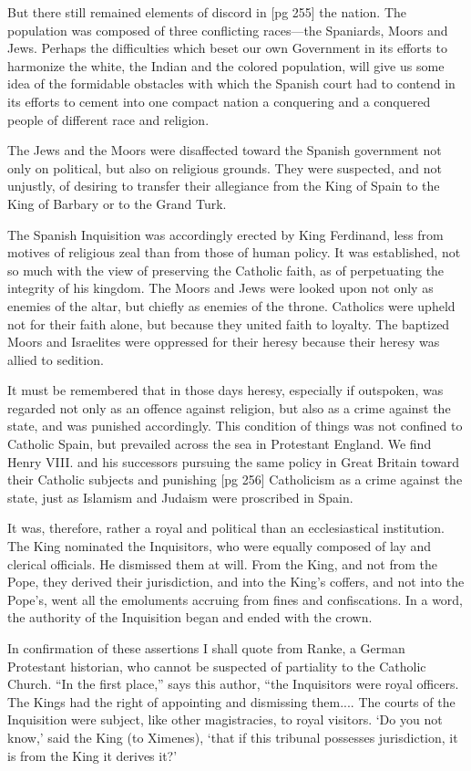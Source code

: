 But there still remained elements of discord in
[pg 255]
the nation. The population was composed of three
conflicting races—the Spaniards, Moors and Jews.
Perhaps the difficulties which beset our own Government
in its efforts to harmonize the white, the
Indian and the colored population, will give us
some idea of the formidable obstacles with which
the Spanish court had to contend in its efforts to
cement into one compact nation a conquering and
a conquered people of different race and religion.

The Jews and the Moors were disaffected toward
the Spanish government not only on political,
but also on religious grounds. They were suspected,
and not unjustly, of desiring to transfer
their allegiance from the King of Spain to the
King of Barbary or to the Grand Turk.

The Spanish Inquisition was accordingly
erected by King Ferdinand, less from motives
of religious zeal than from those of human
policy. It was established, not so much with the
view of preserving the Catholic faith, as of perpetuating
the integrity of his kingdom. The
Moors and Jews were looked upon not only as
enemies of the altar, but chiefly as enemies of
the throne. Catholics were upheld not for their
faith alone, but because they united faith to loyalty.
The baptized Moors and Israelites were oppressed
for their heresy because their heresy was
allied to sedition.

It must be remembered that in those days heresy,
especially if outspoken, was regarded not only
as an offence against religion, but also as a crime
against the state, and was punished accordingly.
This condition of things was not confined to Catholic
Spain, but prevailed across the sea in Protestant
England. We find Henry VIII. and his
successors pursuing the same policy in Great
Britain toward their Catholic subjects and punishing
[pg 256]
Catholicism as a crime against the state,
just as Islamism and Judaism were proscribed
in Spain.

It was, therefore, rather a royal and political
than an ecclesiastical institution. The King nominated
the Inquisitors, who were equally composed
of lay and clerical officials. He dismissed
them at will. From the King, and not from the
Pope, they derived their jurisdiction, and into the
King's coffers, and not into the Pope's, went all
the emoluments accruing from fines and confiscations.
In a word, the authority of the Inquisition
began and ended with the crown.

In confirmation of these assertions I shall quote
from Ranke, a German Protestant historian, who
cannot be suspected of partiality to the Catholic
Church. “In the first place,” says this author,
“the Inquisitors were royal officers. The Kings
had the right of appointing and dismissing them....
The courts of the Inquisition were subject,
like other magistracies, to royal visitors. ‘Do you
not know,’ said the King (to Ximenes), ‘that if
this tribunal possesses jurisdiction, it is from the
King it derives it?’

